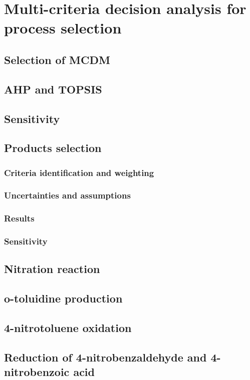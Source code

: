 \section{Multi-criteria decision analysis for process selection}

\subsection{Selection of MCDM}


\subsection{AHP and TOPSIS}


\subsection{Sensitivity}

\subsection{Products selection}

\subsubsection{Criteria identification and weighting}

\subsubsection{Uncertainties and assumptions}

\subsubsection{Results}

\subsubsection{Sensitivity}

\subsection{Nitration reaction}

\subsection{o-toluidine production}

\subsection{4-nitrotoluene oxidation}

\subsection{Reduction of 4-nitrobenzaldehyde and 4-nitrobenzoic acid}

\subsection{}
	
	
	 
	 
	 
	
	
	
	
	
